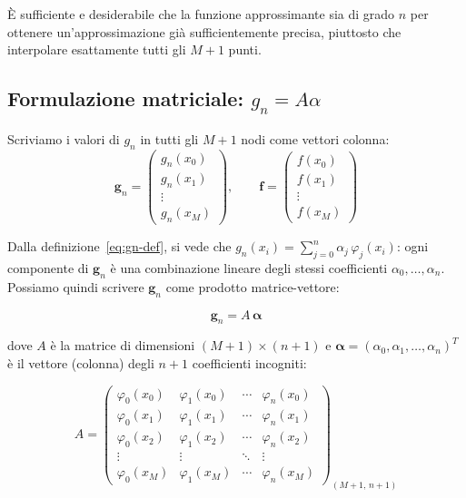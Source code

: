 \documentclass[a4paper,12pt]{article}
\theoremstyle{definition}
\theoremstyle{remark}
\begin{document}
È sufficiente e desiderabile che la funzione approssimante sia
di grado $n$ per ottenere un'approssimazione già sufficientemente precisa,
piuttosto che interpolare esattamente tutti gli $M+1$ punti.

\subsection{Formulazione matriciale: $g_n = A\alpha$}

Scriviamo i valori di $g_n$ in tutti gli $M+1$ nodi come vettori colonna:
\begin{equation}
  \mathbf{g}_n =
  \begin{pmatrix} g_n(x_0) \\ g_n(x_1) \\ \vdots \\ g_n(x_M) \end{pmatrix},
  \qquad
  \mathbf{f} =
  \begin{pmatrix} f(x_0) \\ f(x_1) \\ \vdots \\ f(x_M) \end{pmatrix}
  \label{eq:vettori}
\end{equation}

\noindent Dalla definizione~\eqref{eq:gn-def}, si vede che
$g_n(x_i) = \sum_{j=0}^{n} \alpha_j\,\varphi_j(x_i)$: ogni componente
di $\mathbf{g}_n$ è una combinazione lineare degli stessi coefficienti
$\alpha_0, \ldots, \alpha_n$. Possiamo quindi scrivere
$\mathbf{g}_n$ come prodotto matrice-vettore:

\begin{equation}
  \mathbf{g}_n = A\,\boldsymbol{\alpha}
  \label{eq:gn-Aalpha}
\end{equation}

\noindent dove $A$ è la matrice di dimensioni $(M+1) \times (n+1)$ e
$\boldsymbol{\alpha} = (\alpha_0, \alpha_1, \ldots, \alpha_n)^T$
è il vettore (colonna) degli $n+1$ coefficienti incogniti:

\begin{equation}
  A =
  \begin{pmatrix}
    \varphi_0(x_0) & \varphi_1(x_0) & \cdots & \varphi_n(x_0) \\
    \varphi_0(x_1) & \varphi_1(x_1) & \cdots & \varphi_n(x_1) \\
    \varphi_0(x_2) & \varphi_1(x_2) & \cdots & \varphi_n(x_2) \\
    \vdots         & \vdots         & \ddots & \vdots         \\
    \varphi_0(x_M) & \varphi_1(x_M) & \cdots & \varphi_n(x_M)
  \end{pmatrix}_{(M+1,\,n+1)}
  \label{eq:matrice-A}
\end{equation}
\end{document}
